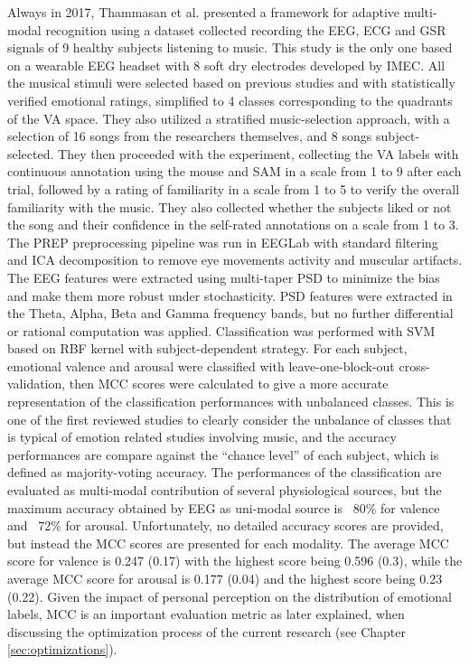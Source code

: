 Always in 2017, Thammasan et al. \cite{thammasan_multimodal_2017} presented a framework for adaptive multi-modal recognition using a dataset collected recording the \ac{EEG}, \ac{ECG} and \ac{GSR} signals of 9 healthy subjects listening to music. This study is the only one based on a wearable \ac{EEG} headset with 8 soft dry electrodes developed by IMEC. All the musical stimuli were selected based on previous studies and with statistically verified emotional ratings, simplified to 4 classes corresponding to the quadrants of the \ac{VA} space. They also utilized a stratified music-selection approach, with a selection of 16 songs from the researchers themselves, and 8 songs subject-selected. They then proceeded with the experiment, collecting the \ac{VA} labels with continuous annotation using the mouse and SAM \cite{bradley_measuring_1994} in a scale from 1 to 9 after each trial, followed by a rating of familiarity in a scale from 1 to 5 to verify the overall familiarity with the music. They also collected whether the subjects liked or not the song and their confidence in the self-rated annotations on a scale from 1 to 3. The PREP \cite{bigdely-shamlo_prep_2015} preprocessing pipeline was run in EEGLab with standard filtering and \ac{ICA} decomposition to remove eye movements activity and muscular artifacts. The \ac{EEG} features were extracted using multi-taper \ac{PSD} to minimize the bias and make them more robust under stochasticity. \ac{PSD} features were extracted in the Theta, Alpha, Beta and Gamma frequency bands, but no further differential or rational computation was applied. Classification was performed with \ac{SVM} based on RBF kernel with subject-dependent strategy. For each subject, emotional valence and arousal were classified with leave-one-block-out cross-validation, then \ac{MCC} scores were calculated to give a more accurate representation of the classification performances with unbalanced classes. This is one of the first reviewed studies to clearly consider the unbalance of classes that is typical of emotion related studies involving music, and the accuracy performances are compare against the “chance level” of each subject, which is defined as majority-voting accuracy. The performances of the classification are evaluated as multi-modal contribution of several physiological sources, but the maximum accuracy obtained by \ac{EEG} as uni-modal source is ~80\% for valence and ~72\% for arousal. Unfortunately, no detailed accuracy scores are provided, but instead the \ac{MCC} scores are presented for each modality. The average \ac{MCC} score for valence is 0.247 (0.17) with the highest score being 0.596 (0.3), while the average \ac{MCC} score for arousal is 0.177 (0.04) and the highest score being 0.23 (0.22). Given the impact of personal perception on the distribution of emotional labels, \ac{MCC} is an important evaluation metric as later explained, when discussing the optimization process of the current research (see Chapter \ref{sec:optimizations}).
